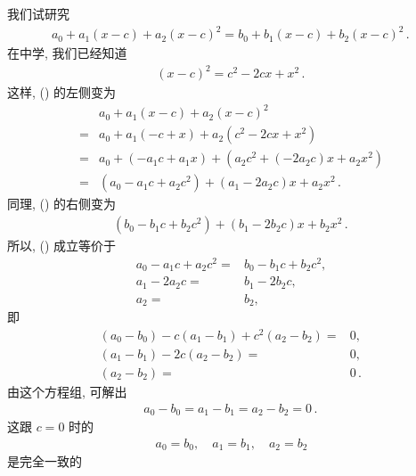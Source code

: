 \begin{example}
    我们试研究
    \begin{align*}
        a_0 + a_1 (x - c) + a_2 (x - c)^2 = b_0 + b_1 (x - c) + b_2 (x - c)^2 \tag*{(\myStar)} \period
    \end{align*}
    在中学, 我们已经知道
    \begin{align*}
        (x - c)^2 = c^2 - 2cx + x^2 \period
    \end{align*}
    这样, (\myStar) 的左侧变为
    \begin{align*}
             & a_0 + a_1 (x - c) + a_2 (x - c)^2                           \\
        = {} & a_0 + a_1 (-c + x) + a_2 (c^2 - 2cx + x^2)                  \\
        = {} & a_0 + (-a_1 c + a_1 x) + (a_2 c^2 + (-2a_2 c) x + a_2 x^2)  \\
        = {} & (a_0 - a_1 c + a_2 c^2) + (a_1 -2a_2 c) x + a_2 x^2 \period
    \end{align*}
    同理, (\myStar) 的右侧变为
    \begin{align*}
        (b_0 - b_1 c + b_2 c^2) + (b_1 -2b_2 c) x + b_2 x^2 \period
    \end{align*}
    所以, (\myStar) 成立等价于
    \begin{align*}
        a_0 - a_1 c + a_2 c^2 = {} & b_0 - b_1 c + b_2 c^2, \\
        a_1 -2a_2 c           = {} & b_1 -2b_2 c,           \\
        a_2                   = {} & b_2,
    \end{align*}
    即
    \begin{align*}
        (a_0 - b_0) - c(a_1 - b_1) + c^2(a_2 - b_2) = {} & 0,        \\
        (a_1 - b_1) - 2c(a_2 - b_2)                 = {} & 0,        \\
        (a_2 - b_2)                                 = {} & 0 \period
    \end{align*}
    由这个方程组, 可解出
    \begin{align*}
        a_0 - b_0 = a_1 - b_1 = a_2 - b_2 = 0 \period
    \end{align*}
    这跟 $c = 0$ 时的
    \begin{align*}
        a_0 = b_0, \quad a_1 = b_1, \quad a_2 = b_2
    \end{align*}
    是完全一致的\period
\end{example}

